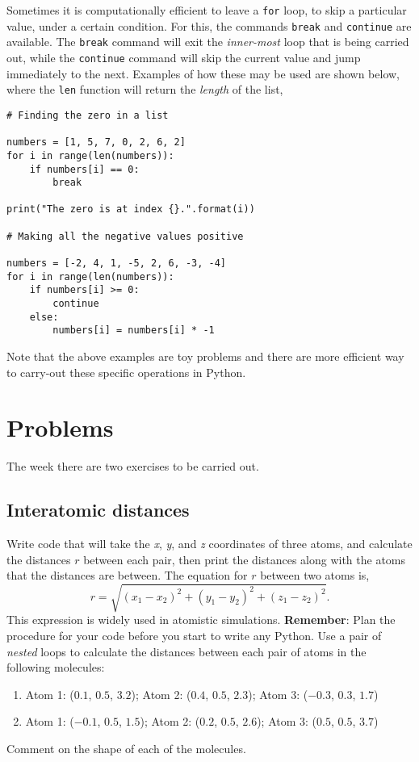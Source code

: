 \documentclass[a4paper]{article}
\begin{document}
Sometimes it is computationally efficient to leave a \texttt{for} loop, to skip a particular value, under a certain condition.
For this, the commands \texttt{break} and \texttt{continue} are available.
The \texttt{break} command will exit the \emph{inner-most} loop that is being carried out, while the \texttt{continue} command will skip the current value and jump immediately to the next.
Examples of how these may be used are shown below, where the \texttt{len} function will return the \emph{length} of the list,
\begin{lstlisting}
# Finding the zero in a list

numbers = [1, 5, 7, 0, 2, 6, 2]
for i in range(len(numbers)):
	if numbers[i] == 0:
		break

print("The zero is at index {}.".format(i))

# Making all the negative values positive

numbers = [-2, 4, 1, -5, 2, 6, -3, -4]
for i in range(len(numbers)):
	if numbers[i] >= 0:
		continue
	else:
		numbers[i] = numbers[i] * -1
\end{lstlisting}
Note that the above examples are toy problems and there are more efficient way to carry-out these specific operations in Python.

\section{Problems}

The week there are two exercises to be carried out.

\subsection{Interatomic distances}

Write code that will take the \emph{x}, \emph{y}, and \emph{z} coordinates of three atoms, and calculate the distances $r$ between each pair, then print the distances along with the atoms that the distances are between.
The equation for $r$ between two atoms is,
\begin{equation}
	r = \sqrt{(x_1 - x_2)^2 + (y_1 - y_2)^2 + (z_1 - z_2)^2}.
\end{equation}
This expression is widely used in atomistic simulations.
\textbf{Remember}: Plan the procedure for your code before you start to write any Python.
Use a pair of \emph{nested} loops to calculate the distances between each pair of atoms in the following molecules:
\begin{enumerate}
	\item{Atom 1: ($0.1$, $0.5$, $3.2$); Atom 2: ($0.4$, $0.5$, $2.3$); Atom 3: ($-0.3$, $0.3$, $1.7$)}
	\item{Atom 1: ($-0.1$, $0.5$, $1.5$); Atom 2: ($0.2$, $0.5$, $2.6$); Atom 3: ($0.5$, $0.5$, $3.7$)}
\end{enumerate}
Comment on the shape of each of the molecules.
\end{document}
